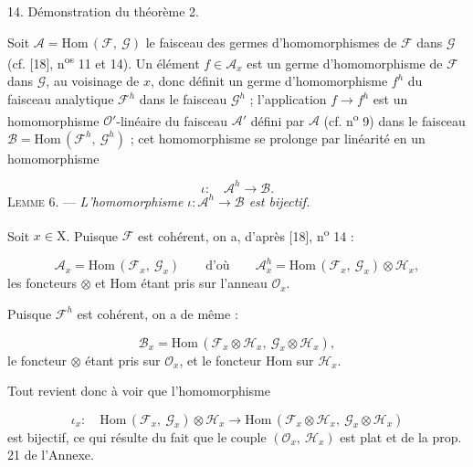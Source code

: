 14. Démonstration du théorème 2.

Soit $\mathcal{A} = \mathrm{Hom}\,(\mathcal{F},\ \mathcal{G})$ le faisceau des germes d'homomorphismes de $\mathcal{F}$ dans $\mathcal{G}$ (cf. [18], n\textsuperscript{os} 11 et 14). Un élément $f \in \mathcal{A}_x$ est un germe d'homomorphisme de $\mathcal{F}$ dans $\mathcal{G}$, au voisinage de $x$, donc définit un germe d'homomorphisme $f^{h}$ du faisceau analytique $\mathcal{F}^{h}$ dans le faisceau $\mathcal{G}^{h}$ ; l'application $f \to f^{h}$ est un homomorphisme $\mathcal{O}'$-linéaire du faisceau $\mathcal{A}'$ défini par $\mathcal{A}$ (cf. n\textsuperscript{o} 9) dans le faisceau $\mathcal{B} = \mathrm{Hom}\,(\mathcal{F}^{h},\ \mathcal{G}^{h})$ ; cet homomorphisme se prolonge par linéarité en un homomorphisme

\begin{equation*}
\iota : \quad \mathcal{A}^{h} \to \mathcal{B}.
\end{equation*}
\textsc{Lemme} 6. — \textit{L'homomorphisme $\iota : \mathcal{A}^{h} \to \mathcal{B}$ est bijectif.}

Soit $x \in \mathrm{X}$. Puisque $\mathcal{F}$ est cohérent, on a, d'après [18], n\textsuperscript{o} 14 :

\begin{equation*}
\mathcal{A}_{x} = \mathrm{Hom}\,(\mathcal{F}_{x},\ \mathcal{G}_{x}) \qquad \mbox{d'où} \qquad \mathcal{A}^{h}_{x} = \mathrm{Hom}\,(\mathcal{F}_{x},\ \mathcal{G}_{x}) \otimes \mathcal{H}_{x},
\end{equation*}
les foncteurs $\otimes$ et $\mathrm{Hom}$ étant pris sur l'anneau $\mathcal{O}_x$.

Puisque $\mathcal{F}^{h}$ est cohérent, on a de même :

\begin{equation*}
\mathcal{B}_{x} = \mathrm{Hom}\,(\mathcal{F}_{x} \otimes \mathcal{H}_{x},\ \mathcal{G}_{x} \otimes \mathcal{H}_{x}),
\end{equation*}
le foncteur $\otimes$ étant pris sur $\mathcal{O}_x$, et le foncteur $\mathrm{Hom}$ sur $\mathcal{H}_x$.

Tout revient donc à voir que l'homomorphisme

\begin{equation*}
\iota_{x} : \quad \mathrm{Hom}\,(\mathcal{F}_{x},\ \mathcal{G}_{x}) \otimes \mathcal{H}_{x} \to \mathrm{Hom}\,(\mathcal{F}_{x} \otimes \mathcal{H}_{x},\ \mathcal{G}_{x} \otimes \mathcal{H}_{x})
\end{equation*}
est bijectif, ce qui résulte du fait que le couple $(\mathcal{O}_x,\ \mathcal{H}_x)$ est plat et de la prop. 21 de l'Annexe.


